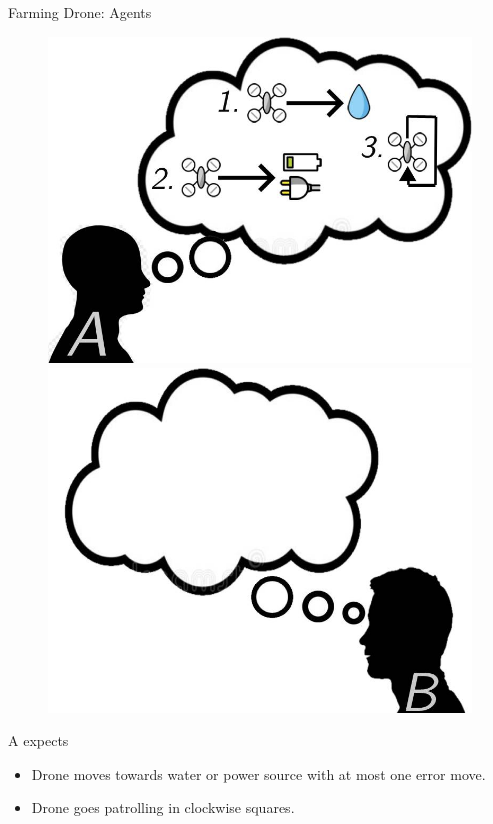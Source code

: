 \documentclass{beamer}
\begin{document}
\begin{frame}{Farming Drone: Agents}
    \begin{figure}
        \centering
        \includegraphics[scale=0.2]{images/a-expects-patrol.jpg}
        \includegraphics[scale=0.2]{images/b-expects.jpg}
    \end{figure}
    A expects
    \begin{itemize}
        \item Drone moves towards water or power source with at most one error move. 
        \item Drone goes patrolling in clockwise squares.
    \end{itemize}
\end{frame}
\end{document}
